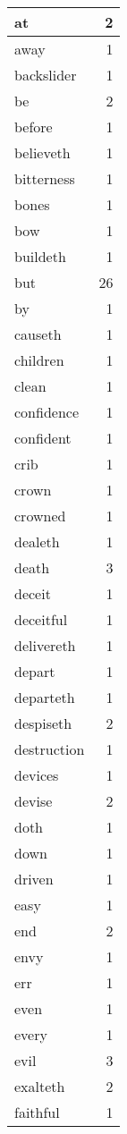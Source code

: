 \begin{center}
\begin{longtable}{l|r}
at & 2\\ \hline 
away & 1\\ \hline 
backslider & 1\\ \hline 
be & 2\\ \hline 
before & 1\\ \hline 
believeth & 1\\ \hline 
bitterness & 1\\ \hline 
bones & 1\\ \hline 
bow & 1\\ \hline 
buildeth & 1\\ \hline 
but & 26\\ \hline 
by & 1\\ \hline 
causeth & 1\\ \hline 
children & 1\\ \hline 
clean & 1\\ \hline 
confidence & 1\\ \hline 
confident & 1\\ \hline 
crib & 1\\ \hline 
crown & 1\\ \hline 
crowned & 1\\ \hline 
dealeth & 1\\ \hline 
death & 3\\ \hline 
deceit & 1\\ \hline 
deceitful & 1\\ \hline 
delivereth & 1\\ \hline 
depart & 1\\ \hline 
departeth & 1\\ \hline 
despiseth & 2\\ \hline 
destruction & 1\\ \hline 
devices & 1\\ \hline 
devise & 2\\ \hline 
doth & 1\\ \hline 
down & 1\\ \hline 
driven & 1\\ \hline 
easy & 1\\ \hline 
end & 2\\ \hline 
envy & 1\\ \hline 
err & 1\\ \hline 
even & 1\\ \hline 
every & 1\\ \hline 
evil & 3\\ \hline 
exalteth & 2\\ \hline 
faithful & 1\\ \hline 

\end{longtable}
\end{center}
